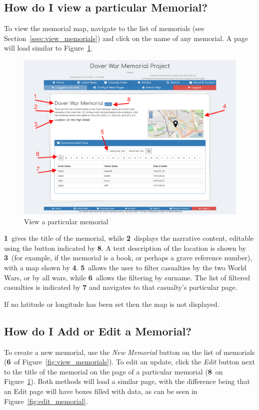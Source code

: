 \documentclass[12pt]{article}
\newcommand{\marker}[1]{\color{red}\textbf{#1}\color{black}}
\begin{document}
\newpage
\FloatBarrier
\subsection{How do I view a particular Memorial?}
To view the memorial map, navigate to the list of memorials (see Section~\ref{ssec:view_memorials}) and click on the name of any memorial. A page will load similar to Figure~\ref{fig:view_memorial}.

\begin{figure}[h]
  \centering
 \includegraphics[width=.9\textwidth]{pics/view_memorial.png}
	\caption{View a particular memorial}\label{fig:view_memorial}
\end{figure}

\marker{1}\ gives the title of the memorial, while \marker{2}\ displays the narrative content, editable using the button indicated by \marker{8}. A text description of the location is shown by \marker{3}\ (for example, if the memorial is a book, or perhaps a grave reference number), with a map shown by \marker{4}. \marker{5}\ allows the user to filter casualties by the two World Wars, or by all wars, while \marker{6}\ allows the filtering by surname. The list of filtered casualties is indicated by \marker{7} and navigates to that casualty's particular page.

\begin{infoBox}
If no latitude or longitude has been set then the map is not displayed.
\end{infoBox}

\newpage
\FloatBarrier
\subsection{How do I Add or Edit a Memorial?}\label{ssec:edit_memorial}
To create a new memorial, use the \textit{New Memorial} button on the list of memorials (\marker{6}\ of Figure~\ref{fig:view_memorials}). To edit an update, click the \textit{Edit} button next to the title of the memorial on the page of a particular memorial (\marker{8}\ on Figure~\ref{fig:view_memorial}). Both methods will load a similar page, with the difference being that an Edit page will have boxes filled with data, as can be seen in Figure~\ref{fig:edit_memorial}.
\end{document}
